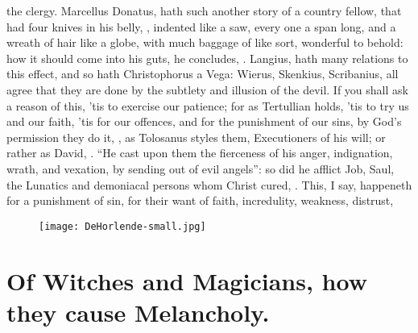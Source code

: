 the clergy. Marcellus Donatus,  hath such another story of a country fellow, that had four knives in
his belly, , indented like a saw, every one a span
long, and a wreath of hair like a globe, with much baggage of like sort,
wonderful to behold: how it should come into his guts, he concludes, . Langius,  hath many relations to this effect, and so hath
Christophorus a Vega: Wierus, Skenkius, Scribanius, all agree that they are
done by the subtlety and illusion of the devil. If you shall ask a reason of
this, 'tis to exercise our patience; for as Tertullian
holds,  'tis to try us and our faith, 'tis for our offences, and for
the punishment of our sins, by God's permission they do it, , as Tolosanus styles them,
Executioners of his will; or rather as David, . \enquote{He
cast upon them the fierceness of his anger, indignation, wrath, and vexation,
by sending out of evil angels}: so did he afflict Job, Saul, the Lunatics and
demoniacal persons whom Christ cured, . \etc{} This, I say,
happeneth for a punishment of sin, for their want of faith, incredulity,
weakness, distrust, \etc{}

\cleartoleftpage{}
\begin{figure}[p]
  \begingroup
  \centering
  \texttt{[image: DeHorlende-small.jpg]}
  \label{fig:dehorlende}
\end{figure}

\clearpage{}
\thispagestyle{titleontop}

\section[Witches and Magicians]{Of Witches and Magicians, how they cause Melancholy.}

